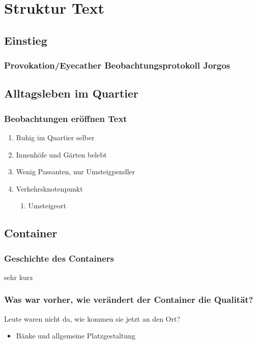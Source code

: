 \documentclass[a4paper,ngerman,11pt]{scrartcl}
\begin{document}
\section{Struktur Text}
\label{sec-3}

\subsection{Einstieg}
\label{sec-3-1}
\subsubsection{Provokation/Eyecather Beobachtungsprotokoll Jorgos}
\label{sec-3-1-1}

\subsection{Alltagsleben im Quartier}
\label{sec-3-2}
\subsubsection{Beobachtungen eröffnen Text}
\label{sec-3-2-1}
\begin{enumerate}
\item Ruhig im Quartier selber
\label{sec-3-2-1-1}
\item Innenhöfe und Gärten belebt
\label{sec-3-2-1-2}
\item Wenig Passanten, nur Umsteigpendler
\label{sec-3-2-1-3}
\item Verkehrsknotenpunkt
\label{sec-3-2-1-4}
\begin{enumerate}
\item Umsteigeort
\label{sec-3-2-1-4-1}
\end{enumerate}
\end{enumerate}

\subsection{Container}
\label{sec-3-3}
\subsubsection{Geschichte des Containers}
\label{sec-3-3-1}
sehr kurz
\subsubsection{Was war vorher, wie verändert der Container die Qualität?}
\label{sec-3-3-2}
Leute waren nicht da, wie kommen sie jetzt an den Ort?
\begin{itemize}
\item Bänke und allgemeine Platzgestaltung
\end{itemize}
\end{document}
